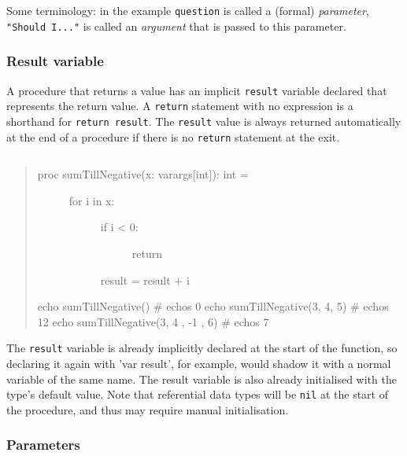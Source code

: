 Some terminology: in the example \texttt{question} is called a (formal)
\emph{parameter}, \texttt{"Should\ I..."} is called an \emph{argument}
that is passed to this parameter.

\hypertarget{result-variable}{%
\subsubsection{Result variable}\label{result-variable}}

A procedure that returns a value has an implicit \texttt{result}
variable declared that represents the return value. A \texttt{return}
statement with no expression is a shorthand for \texttt{return\ result}.
The \texttt{result} value is always returned automatically at the end of
a procedure if there is no \texttt{return} statement at the exit.

\begin{verbatim}
\end{verbatim}

\begin{quote}
\begin{description}
\item[proc sumTillNegative(x: varargs{[}int{]}): int =]
\begin{description}
\item[for i in x:]
\begin{description}
\item[if i \textless{} 0:]
return
\end{description}

result = result + i
\end{description}
\end{description}

echo sumTillNegative() \# echos 0 echo sumTillNegative(3, 4, 5) \# echos
12 echo sumTillNegative(3, 4 , -1 , 6) \# echos 7
\end{quote}

The \texttt{result} variable is already implicitly declared at the start
of the function, so declaring it again with 'var result', for example,
would shadow it with a normal variable of the same name. The result
variable is also already initialised with the type's default value. Note
that referential data types will be \texttt{nil} at the start of the
procedure, and thus may require manual initialisation.

\hypertarget{parameters}{%
\subsubsection{Parameters}\label{parameters}}

